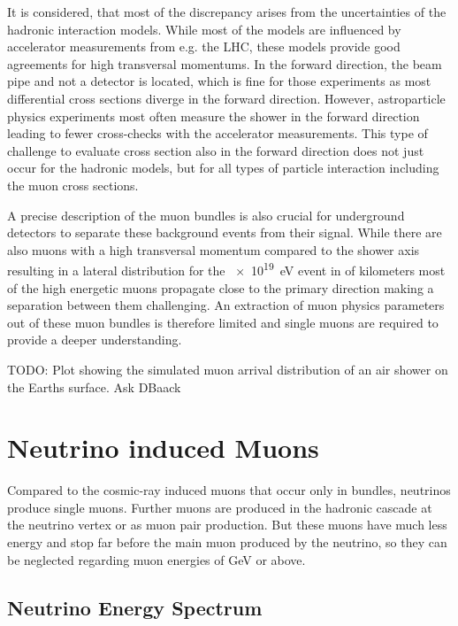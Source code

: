 It is considered, that most of the discrepancy arises from the uncertainties of the hadronic interaction models.
While most of the models are influenced by accelerator measurements from e.g. the LHC, these models provide good agreements for high transversal momentums.
In the forward direction, the beam pipe and not a detector is located, which is fine for those experiments as most differential cross sections diverge in the forward direction.
However, astroparticle physics experiments most often measure the shower in the forward direction leading to fewer cross-checks with the accelerator measurements.
This type of challenge to evaluate cross section also in the forward direction does not just occur for the hadronic models, but for all types of particle interaction including the muon cross sections.

A precise description of the muon bundles is also crucial for underground detectors to separate these background events from their signal.
While there are also muons with a high transversal momentum compared to the shower axis resulting in a lateral distribution for the \SI{e19}{eV} event in  of kilometers \cite{Engel11EAS} most of the high energetic muons propagate close to the primary direction making a separation between them challenging.
An extraction of muon physics parameters out of these muon bundles is therefore limited and single muons are required to provide a deeper understanding.

TODO: Plot showing the simulated muon arrival distribution of an air shower on the Earths surface. Ask DBaack

%
% 
%
%

\section{Neutrino induced Muons}

Compared to the cosmic-ray induced muons that occur only in bundles, neutrinos produce single muons.
Further muons are produced in the hadronic cascade at the neutrino vertex or as muon pair production.
But these muons have much less energy and stop far before the main muon produced by the neutrino, so they can be neglected regarding muon energies of GeV or above.

\subsection{Neutrino Energy Spectrum}

